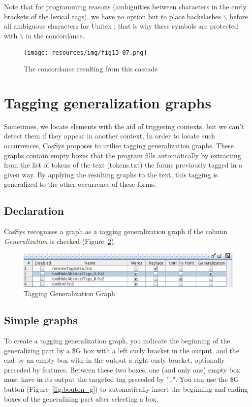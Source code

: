 Note that for programming reasons (ambiguities between characters in the curly brackets of the lexical tags), we have no option but to place backslashes $\backslash$ before all ambiguous characters for Unitex ; that is why these symbols are protected with $\backslash$ in the concordance. 

\begin{figure}[!htb]
  \centering
  \texttt{[image: resources/img/fig13-07.png]}
  \caption{The concordance resulting from this cascade}
  \label{fig13-07}
\end{figure}


\section{Tagging generalization graphs}
\label{graph-generalization}
Sometimes, we locate elements with the aid of triggering contexts, but we can't detect them if they appear
in another context. In order to locate such occurrences, CasSys proposes to
utilise tagging generalization graphs. These graphs contain empty boxes that the program fills automatically
by extracting from the list of tokens of the text (tokens.txt) the forms previously tagged in a given way.
By applying the resulting graphs to the text, this tagging is generalized to the other occurrencs of these forms.

\subsection{Declaration}
CasSys recognises a graph as a tagging generalization graph if the column \emph{Generalization} is
checked (Figure~\ref{fig12-3}).
\begin{figure}[!htb]
  \centering
  \includegraphics[width=15cm]{resources/img/fig12-3.png}
  \caption{Tagging Generalization Graph}
  \label{fig12-3}
\end{figure}

\subsection{Simple graphs}

To create a tagging generalization graph, you indicate the beginning of the generalizing part by a \$G box
with a left curly bracket in the output, and the end by an empty box with in the output a right curly bracket,
optionally preceded by features. Between these two boxes, one (and only one) empty box
must have in its output the targeted tag preceded by ",.".
You can use the \$G button (Figure~\ref{fig:bouton_g}) to automatically insert the beginning and
ending boxes of the generalizing part after selecting a box.

